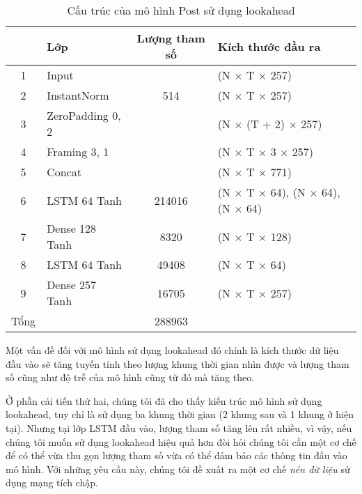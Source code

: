 				\begin{table}
					\centering
					\begin{tabular}{c l c l}
						\hline
								& \textbf{Lớp}		& \textbf{Lượng tham số}		& \textbf{Kích thước đầu ra} \\
						\hline
						1		& Input				&								& (N $\times$ T $\times$ 257) \\
						2		& InstantNorm		&	514							& (N $\times$ T $\times$ 257) \\
						3		& ZeroPadding 0, 2	&								& (N $\times$ (T + 2) $\times$ 257) \\
						4		& Framing 3, 1		&								& (N $\times$ T $\times$ 3 $\times$ 257) \\
						5		& Concat			&								& (N $\times$ T $\times$ 771) \\
						6		& LSTM 64 Tanh		&	214016						& (N $\times$ T $\times$ 64), (N $\times$ 64), (N $\times$ 64) \\
						7		& Dense 128 Tanh	&	8320						& (N $\times$ T $\times$ 128) \\
						8		& LSTM 64 Tanh		&	49408						& (N $\times$ T $\times$ 64) \\
						9		& Dense 257 Tanh	&	16705						& (N $\times$ T $\times$ 257) \\
						\hline
						Tổng	& 					&	288963						& \\
						\hline
					\end{tabular}
					\caption{Cấu trúc của mô hình Post sử dụng lookahead}
				\label{rl::post_lookahead}
				\end{table}
				
		
		 Một vấn đề đối với mô hình sử dụng lookahead đó chính là kích thước dữ liệu đầu vào sẽ tăng tuyến tính theo lượng khung thời gian nhìn được và lượng tham số cũng như độ trễ của mô hình cũng từ đó mà tăng theo.
		
			Ở phần cải tiến thứ hai, chúng tôi đã cho thấy kiến trúc mô hình sử dụng lookahead, tuy chỉ là sử dụng ba khung thời gian (2 khung sau và 1 khung ở hiện tại). Nhưng tại lớp LSTM đầu vào, lượng tham số tăng lên rất nhiều, vì vậy, nếu chúng tôi muốn sử dụng lookahead hiệu quả hơn đòi hỏi chúng tôi cần một cơ chế để có thể vừa thu gọn lượng tham số vừa có thể đảm bảo các thông tin đầu vào mô hình. Với những yêu cầu này, chúng tôi đề xuất ra một cơ chế \textit{nén dữ liệu} sử dụng mạng tích chập.
			
